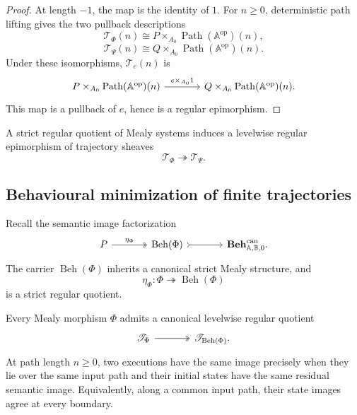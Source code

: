 \begin{proof}
At length \(-1\), the map is the identity of \(1\). For \(n\geq0\),
deterministic path lifting gives the two pullback descriptions
\[
    \mathscr T_\Phi(n)
    \cong
    P\times_{A_0}\operatorname{Path}(\mathbb A^{\mathrm{op}})(n),
\]
\[
    \mathscr T_\Psi(n)
    \cong
    Q\times_{A_0}\operatorname{Path}(\mathbb A^{\mathrm{op}})(n).
\]
Under these isomorphisms, \(\mathscr T_e(n)\) is
\[
\begin{tikzcd}[column sep=large]
    P\times_{A_0}\operatorname{Path}(\mathbb A^{\mathrm{op}})(n)
        \arrow[r, "{e\times_{A_0}1}"]
    &
    Q\times_{A_0}\operatorname{Path}(\mathbb A^{\mathrm{op}})(n).
\end{tikzcd}
\]
This map is a pullback of \(e\), hence is a regular epimorphism.
\end{proof}

\begin{corollary}
\label{cor:levelwise-quotient-trajectory-sheaves}
A strict regular quotient of Mealy systems induces a levelwise regular
epimorphism of trajectory sheaves
\[
    \mathscr T_\Phi
    \twoheadrightarrow
    \mathscr T_\Psi.
\]
\end{corollary}

\subsection{Behavioural minimization of finite trajectories}
\label{subsec:temporal-semantic-minimization}

Recall the semantic image factorization
\[
\begin{tikzcd}[column sep=large]
    P
        \arrow[r, two heads, "\eta_\Phi"]
    &
    \operatorname{Beh}(\Phi)
        \arrow[r, tail]
    &
    \mathbf{Beh}^{\mathrm{can}}_{\mathbb A,\mathbb B,0}.
\end{tikzcd}
\]
The carrier \(\operatorname{Beh}(\Phi)\) inherits a canonical strict Mealy
structure, and
\[
    \eta_\Phi:
    \Phi\twoheadrightarrow\operatorname{Beh}(\Phi)
\]
is a strict regular quotient.

\begin{theorem}
\label{thm:temporal-semantic-quotient}
Every Mealy morphism \(\Phi\) admits a canonical levelwise regular quotient
\[
\begin{tikzcd}[column sep=large]
    \mathscr T_\Phi
        \arrow[r, two heads]
    &
    \mathscr T_{\operatorname{Beh}(\Phi)}.
\end{tikzcd}
\]
At path length \(n\geq0\), two executions have the same image precisely when
they lie over the same input path and their initial states have the same
residual semantic image. Equivalently, along a common input path, their state
images agree at every boundary.
\end{theorem}

